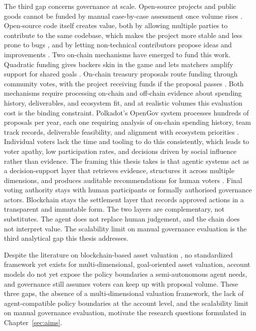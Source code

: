 The third gap concerns governance at scale. Open-source projects and public goods cannot be funded by manual case-by-case assessment once volume rises \cite{Kukelka2022public, Calhoun2006, Ostrom1990}. Open-source code itself creates value, both by allowing multiple parties to contribute to the same codebase, which makes the project more stable and less prone to bugs \cite{Sopko2022}, and by letting non-technical contributors propose ideas and improvements \cite{Alves2022, Yin2021}. Two on-chain mechanisms have emerged to fund this work. Quadratic funding gives backers skin in the game and lets matchers amplify support for shared goals \cite{Buterin2018QF, Buterin2019, Pasquini2021, Buterin2018, Freitas2021, Weyl2018}. On-chain treasury proposals route funding through community votes, with the project receiving funds if the proposal passes \cite{Rodrigues2022, Valastin2024proto}. Both mechanisms require processing on-chain and off-chain evidence about spending history, deliverables, and ecosystem fit, and at realistic volumes this evaluation cost is the binding constraint. Polkadot's OpenGov system processes hundreds of proposals per year, each one requiring analysis of on-chain spending history, team track records, deliverable feasibility, and alignment with ecosystem priorities \cite{Valastin2024proto}. Individual voters lack the time and tooling to do this consistently, which leads to voter apathy, low participation rates, and decisions driven by social influence rather than evidence. The framing this thesis takes is that agentic systems act as a decision-support layer that retrieves evidence, structures it across multiple dimensions, and produces auditable recommendations for human voters \cite{Wang2024survey}. Final voting authority stays with human participants or formally authorised governance actors. Blockchain stays the settlement layer that records approved actions in a transparent and immutable form. The two layers are complementary, not substitutes. The agent does not replace human judgement, and the chain does not interpret value. The scalability limit on manual governance evaluation is the third analytical gap this thesis addresses.

Despite the literature on blockchain-based asset valuation \cite{DeLope2021}, no standardized framework yet exists for multi-dimensional, goal-oriented asset valuation, account models do not yet expose the policy boundaries a semi-autonomous agent needs, and governance still assumes voters can keep up with proposal volume. These three gaps, the absence of a multi-dimensional valuation framework, the lack of agent-compatible policy boundaries at the account level, and the scalability limit on manual governance evaluation, motivate the research questions formulated in Chapter~\ref{sec:aims}.
